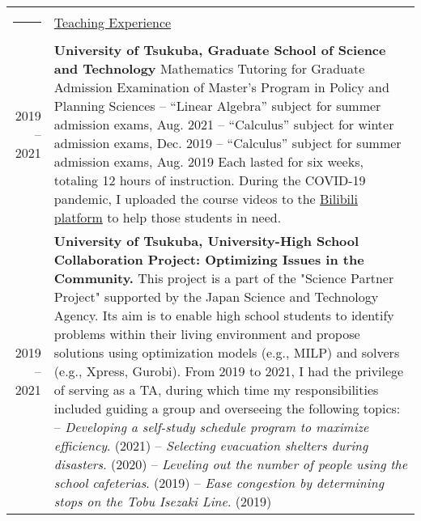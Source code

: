 \documentclass[letterpaper,11pt]{article}
\newcommand{\headingfont}{\LARGE \MakeUppercase }
\newenvironment{SectionTable}[1]{
	\renewcommand*{\arraystretch}{1.0}
	\setlength{\tabcolsep}{10pt}
	\begin{longtable}{Rp{5.2in}} 
		\rule{2.5cm}{4pt} 
		& \underline{#1} \\ %
	}
	{
	\end{longtable}\vspace{-.3cm}
}
\begin{document}
\begin{SectionTable}{\headingfont Teaching Experience}
	2019 -- 2021 &
	\textbf{University of Tsukuba, Graduate School of Science and Technology} \newline
	Mathematics Tutoring for Graduate Admission Examination of Master's Program in Policy and Planning Sciences \newline
	-- ``Linear Algebra'' subject for summer admission exams, Aug. 2021  \newline
	-- ``Calculus'' subject for winter admission exams, Dec. 2019 \newline
	-- ``Calculus'' subject for summer admission exams, Aug. 2019 \newline
	Each lasted for six weeks, totaling 12 hours of instruction. During the COVID-19 pandemic, I uploaded the course videos to the \href{https://space.bilibili.com/16115578}{Bilibili platform} to help those students in need. \\
	 
	 2019 -- 2021 &
	 \textbf{University of Tsukuba, University-High School Collaboration Project: Optimizing Issues in the Community.} \newline	
	This project is a part of the "Science Partner Project" supported by the Japan Science and Technology Agency. Its aim is to enable high school students to identify problems within their living environment and propose solutions using optimization models (e.g., MILP) and solvers (e.g., Xpress, Gurobi). From 2019 to 2021, I had the privilege of serving as a TA, during which time my responsibilities included guiding a group and overseeing the following topics: \newline	
	--  \textit{Developing a self-study schedule program to maximize efficiency}. (2021) \newline
	--  \textit{Selecting evacuation shelters during disasters}. (2020) \newline 
	--  \textit{Leveling out the number of people using the school cafeterias}. (2019) \newline
	--  \textit{Ease congestion by determining stops on the Tobu Isezaki Line}. (2019) 
\end{SectionTable}
\end{document}
